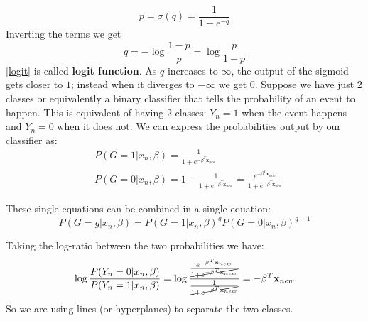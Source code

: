 \documentclass[12pt, letterpaper]{article}
\theoremstyle{definition}
\newcommand{\x}{\mathbf{x}}
\begin{document}
\begin{equation}
p=\sigma(q) = \frac{1}{1+e^{-q}}
\end{equation}
Inverting the terms we get 
\begin{equation}
\label{logit}
q = -\log\frac{1-p}{p} = \log \frac{p}{1-p} 
\end{equation}
\ref{logit} is called \textbf{logit function}. As $q$ increases to $\infty$, the output of the sigmoid gets closer to $1$; instead when it diverges to $-\infty$ we get $0$. Suppose we have just 2 classes or equivalently a binary classifier that tells the probability of an event to happen. This is equivalent of having 2 classes: $Y_n=1$ when the event happens and $Y_n=0$ when it does not. We can express the probabilities output by our classifier as:
\begin{equation}
\begin{aligned}
&P(G=1|x_n, \beta) =  \frac{1}{1+e^{-\beta^T\x_{new}}}\\
&P(G=0|x_n, \beta) = 1- \frac{1}{1+e^{-\beta^T\x_{new}}} = \frac{e^{-\beta^T\x_{new}}}{1+e^{-\beta^T\x_{new}}}
\end{aligned}
\end{equation}

These single equations can be combined in a single equation:
\begin{equation}
P(G=g|x_n, \beta) =  P(G=1|x_n, \beta)^{g} P(G=0|x_n, \beta)^{g-1}
\end{equation}

Taking the log-ratio between the two probabilities we have:
\begin{equation}
\begin{aligned}
\log \frac{P(Y_n=0|x_n, \beta)}{P(Y_n=1|x_n, \beta)} =  \log \frac{\frac{e^{-\beta^T\x_{new}}}{\cancel{1+e^{-\beta^T\x_{new}}}}}{\frac{1}{\cancel{1+e^{-\beta^T\x_{new}}}}} = -\beta^T\x_{new}
\end{aligned}
\end{equation}
So we are using lines (or hyperplanes) to separate the two classes.
\end{document}
